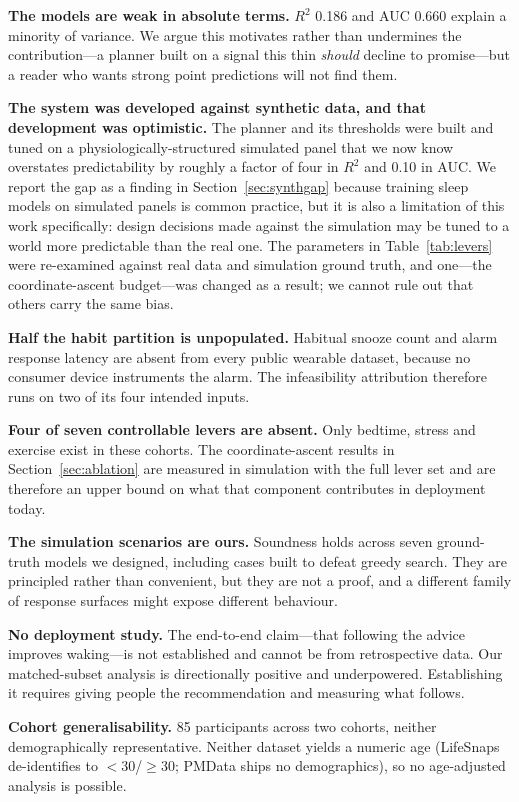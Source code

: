 \documentclass[conference]{IEEEtran}
\begin{document}
\textbf{The models are weak in absolute terms.} $R^2$ 0.186 and AUC 0.660
explain a minority of variance. We argue this motivates rather than undermines
the contribution---a planner built on a signal this thin \emph{should} decline
to promise---but a reader who wants strong point predictions will not find them.

\textbf{The system was developed against synthetic data, and that development
was optimistic.} The planner and its thresholds were built and tuned on a
physiologically-structured simulated panel that we now know overstates
predictability by roughly a factor of four in $R^2$ and 0.10 in AUC. We report
the gap as a finding in Section~\ref{sec:synthgap} because training sleep models
on simulated panels is common practice, but it is also a limitation of this work
specifically: design decisions made against the simulation may be tuned to a
world more predictable than the real one. The parameters in
Table~\ref{tab:levers} were re-examined against real data and simulation ground
truth, and one---the coordinate-ascent budget---was changed as a result; we
cannot rule out that others carry the same bias.

\textbf{Half the habit partition is unpopulated.} Habitual snooze count and
alarm response latency are absent from every public wearable dataset, because no
consumer device instruments the alarm. The infeasibility attribution therefore
runs on two of its four intended inputs.

\textbf{Four of seven controllable levers are absent.} Only bedtime, stress and
exercise exist in these cohorts. The coordinate-ascent results in
Section~\ref{sec:ablation} are measured in simulation with the full lever set
and are therefore an upper bound on what that component contributes in
deployment today.

\textbf{The simulation scenarios are ours.} Soundness holds across seven
ground-truth models we designed, including cases built to defeat greedy search.
They are principled rather than convenient, but they are not a proof, and a
different family of response surfaces might expose different behaviour.

\textbf{No deployment study.} The end-to-end claim---that following the advice
improves waking---is not established and cannot be from retrospective data. Our
matched-subset analysis is directionally positive and underpowered. Establishing
it requires giving people the recommendation and measuring what follows.

\textbf{Cohort generalisability.} 85 participants across two cohorts, neither
demographically representative. Neither dataset yields a numeric age (LifeSnaps
de-identifies to $<$30/$\ge$30; PMData ships no demographics), so no
age-adjusted analysis is possible.
\end{document}
